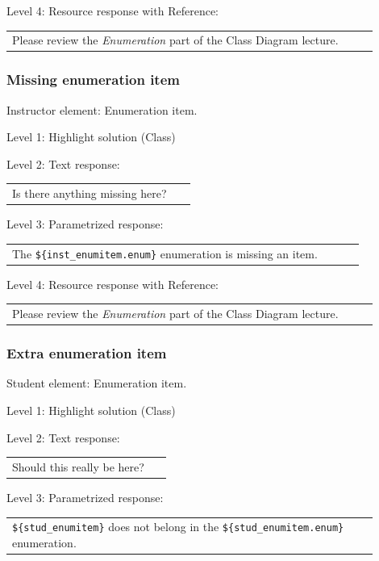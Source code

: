 \noindent Level 4: Resource response with Reference: \medskip

\begin{tabular}{|p{0.9\linewidth}}
Please review the \textit{Enumeration} part of the Class Diagram lecture.
\end{tabular} \medskip


\subsubsection{Missing enumeration item}

Instructor element: Enumeration item. \medskip

\noindent Level 1: Highlight solution (Class) \medskip

\noindent Level 2: Text response: \medskip

\begin{tabular}{|p{0.9\linewidth}}
Is there anything missing here?
\end{tabular} \medskip

\noindent Level 3: Parametrized response: \medskip

\begin{tabular}{|p{0.9\linewidth}}
The \verb|${inst_enumitem.enum}| enumeration is missing an item.
\end{tabular} \medskip

\noindent Level 4: Resource response with Reference: \medskip

\begin{tabular}{|p{0.9\linewidth}}
Please review the \textit{Enumeration} part of the Class Diagram lecture.
\end{tabular} \medskip


\subsubsection{Extra enumeration item}

Student element: Enumeration item.  \medskip

\noindent Level 1: Highlight solution (Class) \medskip

\noindent Level 2: Text response: \medskip

\begin{tabular}{|p{0.9\linewidth}}
Should this really be here?
\end{tabular} \medskip

\noindent Level 3: Parametrized response: \medskip

\begin{tabular}{|p{0.9\linewidth}}
\verb|${stud_enumitem}| does not belong in the \verb|${stud_enumitem.enum}| enumeration.
\end{tabular} \medskip

